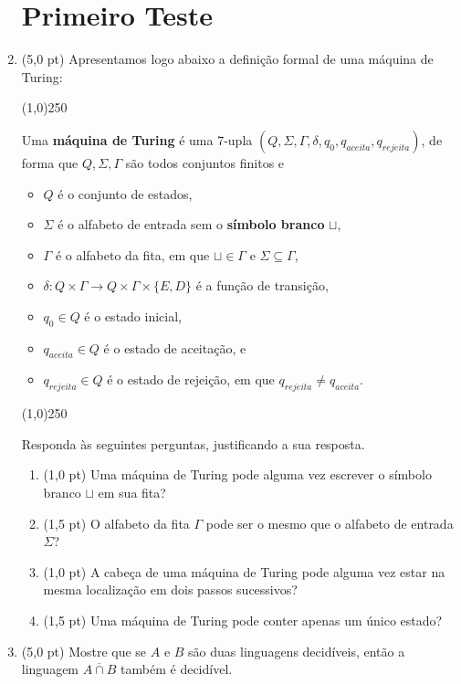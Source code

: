 \documentclass[12pt,a4paper,oneside]{article}
\begin{document}
\begin{enumerate}
	
	\section*{Primeiro Teste}
	
	\item (5,0 pt) Apresentamos logo abaixo a definição formal de uma máquina de Turing:
	
	\begin{center}
	\line(1,0){250}
	\end{center}	
	
	Uma {\bf máquina de Turing} é uma 7-upla $(Q, \Sigma, \Gamma, \delta, q_0, q_{aceita}, q_{rejeita})$, de forma que $Q, \Sigma, \Gamma$ são todos conjuntos finitos e
	
		\begin{itemize}
			\item $Q$ é o conjunto de estados,
			\item $\Sigma$ é o alfabeto de entrada sem o {\bf símbolo branco} $\sqcup$,
			\item $\Gamma$ é o alfabeto da fita, em que $\sqcup \in \Gamma$ e $\Sigma \subseteq \Gamma$,
			\item $\delta : Q \times \Gamma \rightarrow Q \times \Gamma \times \{E, D\}$ é a função de transição,
			\item $q_0 \in Q$ é o estado inicial,
			\item $q_{aceita} \in Q$ é o estado de aceitação, e
			\item $q_{rejeita} \in Q$ é o estado de rejeição, em que $q_{rejeita} \not= q_{aceita}$.
		\end{itemize}
		
	\begin{center}
	\line(1,0){250}
	\end{center}		
		
	 Responda às seguintes perguntas, justificando a sua resposta.
	\begin{enumerate}
		\item (1,0 pt) Uma máquina de Turing pode alguma vez escrever o símbolo branco $\sqcup$ em sua fita?
		\item (1,5 pt) O alfabeto da fita $\Gamma$ pode ser o mesmo que o alfabeto de entrada $\Sigma$?
		\item (1,0 pt) A cabeça de uma máquina de Turing pode alguma vez estar na mesma localização em dois passos sucessivos?
		\item (1,5 pt) Uma máquina de Turing pode conter apenas um único estado?
	\end{enumerate}
	
	\item (5,0 pt) Mostre que se $A$ e $B$ são duas linguagens decidíveis, então a linguagem $\overline{A \cap B}$ também é decidível.

\end{enumerate}
\end{document}
